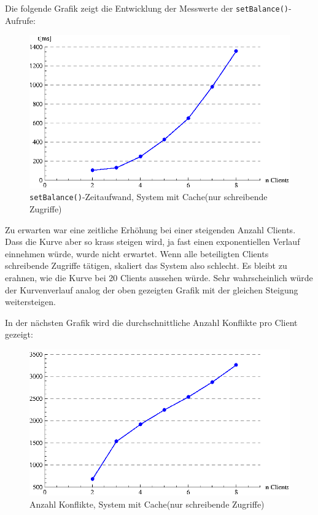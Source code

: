 Die folgende Grafik zeigt die Entwicklung der Messwerte der \texttt{set\-Balance()}-Aufrufe:
\begin{figure}[H]
\begin{center}
\includegraphics[width=\textwidth]{images_MessErgebnisse/incrementCacheSetBalance.eps}
\end{center}
\caption{\texttt{setBalance()}-Zeitaufwand, System mit Cache(nur schreibende Zugriffe)}
\end{figure}

Zu erwarten war eine zeitliche Erhöhung bei einer steigenden Anzahl Clients. Dass die Kurve aber so krass steigen wird, ja fast einen exponentiellen Verlauf einnehmen würde, wurde nicht erwartet. Wenn alle beteiligten Clients schreibende Zugriffe tätigen, skaliert das System also schlecht. Es bleibt zu erahnen, wie die Kurve bei 20 Clients aussehen würde. Sehr wahrscheinlich würde der Kurvenverlauf analog der oben gezeigten Grafik mit der gleichen Steigung weitersteigen.

In der nächsten Grafik wird die durchschnittliche Anzahl Konflikte pro Client gezeigt:
\begin{figure}[H]
\begin{center}
\includegraphics[width=\textwidth]{images_MessErgebnisse/incrementCacheKonfliktzahl.eps}
\end{center}
\caption{Anzahl Konflikte, System mit Cache(nur schreibende Zugriffe)}
\end{figure}

